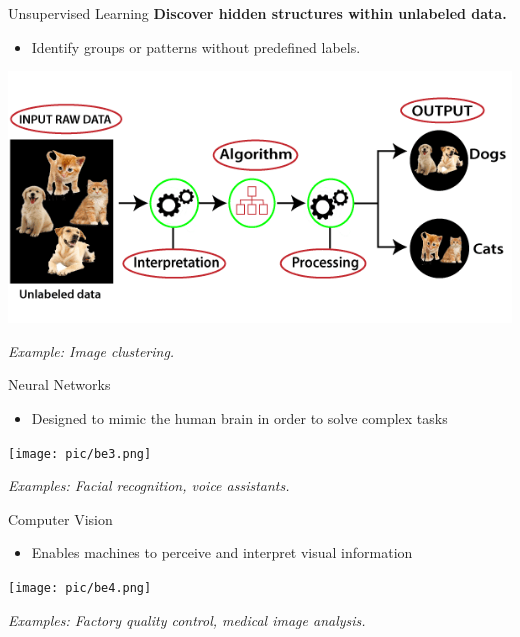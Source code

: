 \documentclass[serif, aspectratio=169]{beamer}
\begin{document}
\begin{frame}{Unsupervised Learning}
\textbf{Discover hidden structures within unlabeled data.}

\begin{itemize}
    \item Identify groups or patterns without predefined labels.
\end{itemize}

\begin{center}
    \includegraphics[width=0.7\linewidth]{pic/be2.png}
\end{center}

\begin{center}
\textit{Example: Image clustering.}
\end{center}
\end{frame}



\begin{frame}{Neural Networks}
    \begin{itemize}
        \item Designed to mimic the human brain in order to solve complex tasks
    \end{itemize}
    \vspace{0.4cm}
    \begin{center}
        \texttt{[image: pic/be3.png]}
    \end{center}
    \vspace{0.3cm}
    \begin{center}
        \textit{Examples: Facial recognition, voice assistants.}
    \end{center}
\end{frame}

\begin{frame}{Computer Vision}
    \begin{itemize}
        \item Enables machines to perceive and interpret visual information
    \end{itemize}
    \begin{center}
        \texttt{[image: pic/be4.png]}
    \end{center}
    \begin{center}
        \textit{Examples: Factory quality control, medical image analysis.}
    \end{center}
\end{frame}
\end{document}

